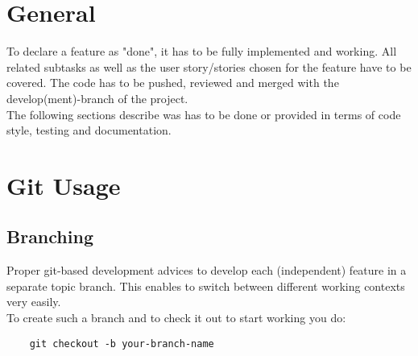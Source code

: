 \documentclass[twoside,12pt,a4paper]{article}
\begin{document}
\newpage

\setcounter{page}{1}


\renewcommand{\baselinestretch}{1.3}
\small\normalsize

\tableofcontents

\renewcommand{\baselinestretch}{1}
\small\normalsize

\newpage


\section{General} %
\label{sec:general}
To declare a feature as "done", it has to be fully implemented and working. All related subtasks as well as the user story/stories chosen for the feature have to be covered. The code has to be pushed, reviewed and merged with the develop(ment)-branch of the project. \\
The following sections describe was has to be done or provided in terms of code style, testing and documentation. 



\section{Git Usage} %
\label{sec:git_usage}

\subsection{Branching} %
\label{sub:branching}

Proper git-based development advices to develop each (independent) feature in a separate topic branch. This enables to switch between different working contexts very easily. \\
To create such a branch and to check it out to start working you do:

\begin{lstlisting}
	git checkout -b your-branch-name
\end{lstlisting}
\end{document}
